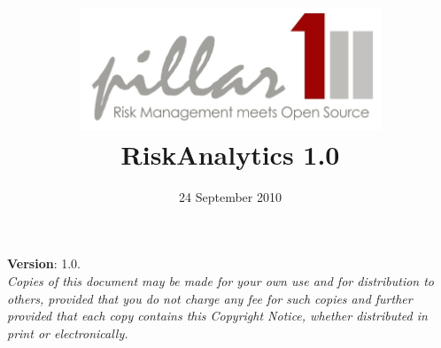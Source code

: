 

\begin{titlepage}
%
\title{\includegraphics[width=9cm]{images/pillarone-logo-simple-small.jpg}\\[2cm]
%
{\Huge \textsf{RiskAnalytics 1.0}}\\[1cm]}
\author{}%
\date{24 September 2010}%
\maketitle

\begin{flushleft}
{\small{
{\bfseries Version}: 1.0.\pageref{LastPage}\\[1cm]

\emph{Copies of this document may be made for your own use and for distribution to others, provided that you do not charge any fee for such copies and further provided that each copy contains this Copyright Notice, whether distributed in print or electronically.}\\[1cm]

}}
\end{flushleft}
\end{titlepage}

